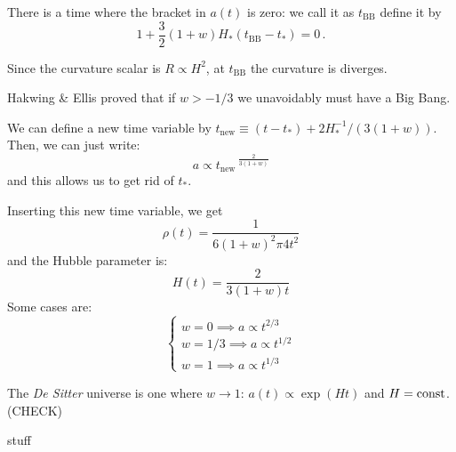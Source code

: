\documentclass[main.tex]{subfiles}
\begin{document}
There is a time where the bracket in \(a(t)\) is zero: we call it as \(t_{\text{BB}}\) define it by
\begin{equation}
  1 + \frac{3}{2} (1+w) H_{*} (t_{\text{BB}} - t_* ) = 0\,.
\end{equation}

Since the curvature scalar is \(R \propto H^2\), at \(t_{\text{BB}}\)  the curvature is diverges.

Hakwing \& Ellis proved that if \(w>-1/3\) we unavoidably must have a Big Bang.

We can define a new time variable by \(t_{\text{new}} \equiv (t - t_{*}) + 2 H_*^{-1} / (3 (1+w))\). Then, we can just write:
\begin{equation}
  a \propto t_{\text{new}}\,^{\frac{2}{3(1+w)}}
\end{equation}
and this allows us to get rid of \(t_{*}\).

Inserting this new time variable, we get
\begin{equation}
  \rho(t) = \frac{1}{6 (1+w)^2 \pi 4 t^2}
\end{equation}
and the Hubble parameter is:
\begin{equation}
  H(t) = \frac{2}{3(1+w) t}
\end{equation}
Some cases are:
\begin{equation}
  \begin{cases}
      w = 0 \implies a \propto t^{2/3}  \\
      w=1/3 \implies a \propto t^{1/2} \\  
      w=1 \implies a \propto t^{1/3}  
  \end{cases}
\end{equation}

The \emph{De Sitter} universe is one where \(w \rightarrow 1\): \(a(t) \propto \exp(Ht) \) and \(H = \text{const}\). (CHECK) 

stuff
\end{document}
